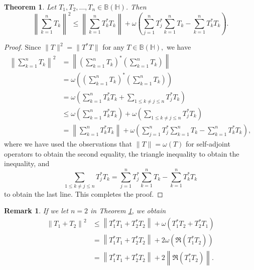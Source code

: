 \documentclass[12pt,twoside,reqno]{amsart}
\newtheorem{theorem}{Theorem}[section]
\newtheorem{remark}{Remark}[section]
\numberwithin{equation}{section}
\begin{document}
\begin{theorem}\label{Thm_n_1}
Let ${{T}_{1}},{{T}_{2}},\ldots ,{{T}_{n}}\in \mathbb B\left( \mathbb H \right)$. Then 
	\[{{\left\| \sum\limits_{k=1}^{n}{{{T}_{k}}} \right\|}^{2}}\le \left\| \sum\limits_{k=1}^{n}{T_{k}^{*}{{T}_{k}}} \right\|+\omega \left( \sum\limits_{j=1}^{n}{T_{j}^{*}}\sum\limits_{k=1}^{n}{{{T}_{k}}}-\sum\limits_{k=1}^{n}{T_{k}^{*}{{T}_{k}}} \right).\]
\end{theorem}
\begin{proof}
Since $\|T\|^2=\|T^*T\|$ for any $T\in\mathbb{B}(\mathbb{H}),$ we have
\begin{align*}
{{\left\| \sum\limits_{k=1}^{n}{{{T}_{k}}} \right\|}^{2}}&=\left\|\left(\sum\limits_{k=1}^{n}{{{T}_{k}}}\right)^*\left(\sum\limits_{k=1}^{n}T_{k}\right)\right\|\\
&=\omega\left( \left(\sum\limits_{k=1}^{n}{{{T}_{k}}}\right)^*\left(\sum\limits_{k=1}^{n}T_{k}\right)     \right)\\
&=\omega\left(\sum_{k=1}^{n}T_{k}^*T_{k}+\sum_{1\leq k\not=j\leq n}T_j^*T_{k}\right)\\
&\leq \omega\left(\sum_{k=1}^{n}T_{k}^*T_{k}\right)+\omega\left(\sum_{1\leq k\not=j\leq n}T_j^*T_{k}\right)\\
&=\left\|\sum_{k=1}^{n}T_{k}^*T_{k}\right\|+\omega\left(\sum\limits_{j=1}^{n}{T_{j}^{*}}\sum\limits_{k=1}^{n}{{{T}_{k}}}-\sum\limits_{k=1}^{n}{T_{k}^{*}{{T}_{k}}}\right),
\end{align*}
where we have used the observations that $\|T\|=\omega(T)$ for self-adjoint operators to obtain the second equality, the triangle inequality to obtain the inequality, and 
\[\sum\limits_{1\le k\ne j\le n}{T_{j}^{*}{{T}_{k}}}=\sum\limits_{j=1}^{n}{T_{j}^{*}}\sum\limits_{k=1}^{n}{{{T}_{k}}}-\sum\limits_{k=1}^{n}{T_{k}^{*}{{T}_{k}}}\]
to obtain the last line. This completes the proof.
\end{proof}


\begin{remark}
If we let $n=2$ in Theorem \ref{Thm_n_1}, we obtain
	\[\begin{aligned}
   {{\left\| {{T}_{1}}+{{T}_{2}} \right\|}^{2}}&\le \left\| T_{1}^{*}{{T}_{1}}+T_{2}^{*}{{T}_{2}} \right\|+\omega \left( T_{1}^{*}{{T}_{2}}+T_{2}^{*}{{T}_{1}} \right) \\ 
 & =\left\| T_{1}^{*}{{T}_{1}}+T_{2}^{*}{{T}_{2}} \right\|+2\omega \left( \Re\left( T_{1}^{*}{{T}_{2}} \right) \right) \\ 
 & =\left\| T_{1}^{*}{{T}_{1}}+T_{2}^{*}{{T}_{2}} \right\|+2\left\| \Re\left( T_{1}^{*}{{T}_{2}} \right) \right\|.  
\end{aligned}\]
\end{remark}
\end{document}
